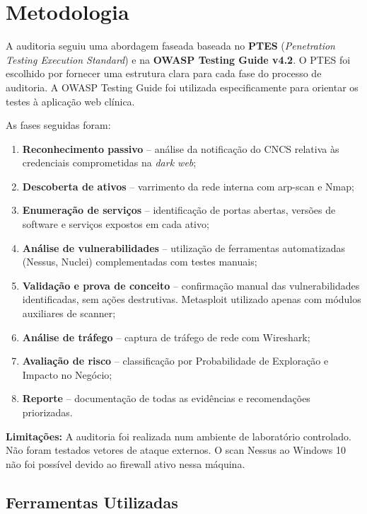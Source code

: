 \documentclass[12pt, a4paper]{report}
\begin{document}
\chapter{Metodologia}

A auditoria seguiu uma abordagem faseada baseada no \textbf{PTES} (\textit{Penetration Testing
Execution Standard}) e na \textbf{OWASP Testing Guide v4.2}. O PTES foi escolhido por fornecer
uma estrutura clara para cada fase do processo de auditoria. A OWASP Testing Guide foi utilizada
especificamente para orientar os testes à aplicação web clínica.

As fases seguidas foram:

\begin{enumerate}[leftmargin=*,itemsep=4pt]
  \item \textbf{Reconhecimento passivo} -- análise da notificação do CNCS relativa às credenciais
        comprometidas na \textit{dark web};
  \item \textbf{Descoberta de ativos} -- varrimento da rede interna com arp-scan e Nmap;
  \item \textbf{Enumeração de serviços} -- identificação de portas abertas, versões de software
        e serviços expostos em cada ativo;
  \item \textbf{Análise de vulnerabilidades} -- utilização de ferramentas automatizadas (Nessus,
        Nuclei) complementadas com testes manuais;
  \item \textbf{Validação e prova de conceito} -- confirmação manual das vulnerabilidades
        identificadas, sem ações destrutivas. Metasploit utilizado apenas com módulos auxiliares
        de scanner;
  \item \textbf{Análise de tráfego} -- captura de tráfego de rede com Wireshark;
  \item \textbf{Avaliação de risco} -- classificação por Probabilidade de Exploração e Impacto
        no Negócio;
  \item \textbf{Reporte} -- documentação de todas as evidências e recomendações priorizadas.
\end{enumerate}

\textbf{Limitações:} A auditoria foi realizada num ambiente de laboratório controlado. Não foram
testados vetores de ataque externos. O scan Nessus ao Windows 10 não foi possível devido ao
firewall ativo nessa máquina.

\section{Ferramentas Utilizadas}
\end{document}

